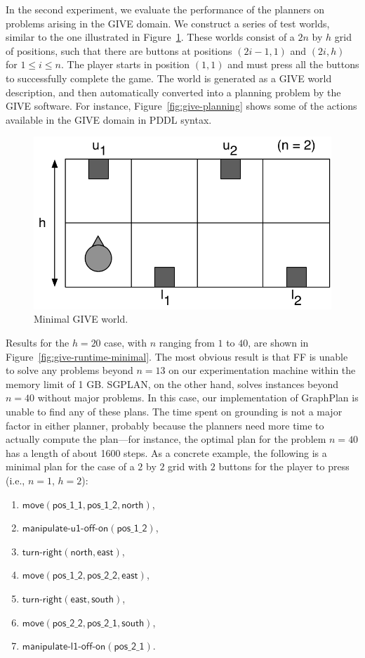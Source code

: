 In the second experiment, we evaluate the performance of the planners on
problems arising in the GIVE domain. We construct a series of test worlds,
similar to the one illustrated in Figure~\ref{fig:give-minimal}. These
worlds consist of a $2n$ by $h$ grid of positions, such that there are
buttons at positions $(2i-1,1)$ and $(2i,h)$ for $1 \leq i \leq n$. The
player starts in position $(1,1)$ and must press all the buttons
to successfully complete the game. The world is generated as a GIVE world
description, and then automatically converted into a planning problem by
the GIVE software. For instance, Figure~\ref{fig:give-planning} shows some
of the actions available in the GIVE domain in PDDL syntax.

\begin{figure}[t]
  \centering
  \includegraphics[width=0.5\columnwidth]{pic-buttons}
  \caption{Minimal GIVE world.}
  \label{fig:give-minimal}
\end{figure}

Results for the $h=20$ case, with $n$ ranging from $1$ to $40$, are shown
in Figure~\ref{fig:give-runtime-minimal}. The most obvious result is that
FF is unable to solve any problems beyond $n=13$ on our experimentation
machine within the memory limit of 1 GB. SGPLAN, on the other hand, solves
instances beyond $n=40$ without major problems. In this case, our
implementation of GraphPlan is unable to find any of these plans. The time
spent on grounding is not a major factor in either planner, probably
because the planners need more time to actually compute the plan---for
instance, the optimal plan for the problem $n=40$ has a length of about
1600 steps. As a concrete example, the following is a minimal plan for the
case of a $2$ by $2$ grid with $2$ buttons for the player to press (i.e.,
$n=1$, $h=2$):

\begin{enumerate}
\item $\mathsf{move}(\mathsf{pos\_1\_1},\mathsf{pos\_1\_2}, \mathsf{north})$,
\item $\mathsf{manipulate}\textsf{-}\mathsf{u1}\textsf{-}\mathsf{off}\textsf{-}\mathsf{on}(\mathsf{pos\_1\_2})$,
\item $\mathsf{turn}\textsf{-}\mathsf{right}(\mathsf{north}, \mathsf{east})$,
\item $\mathsf{move}(\mathsf{pos\_1\_2}, \mathsf{pos\_2\_2},
  \mathsf{east})$,
\item $\mathsf{turn}\textsf{-}\mathsf{right}(\mathsf{east}, \mathsf{south})$,
\item $\mathsf{move}(\mathsf{pos\_2\_2}, \mathsf{pos\_2\_1}, \mathsf{south})$,
\item $\mathsf{manipulate}\textsf{-}\mathsf{l1}\textsf{-}\mathsf{off}\textsf{-}\mathsf{on}(\mathsf{pos\_2\_1})$.
\end{enumerate}


